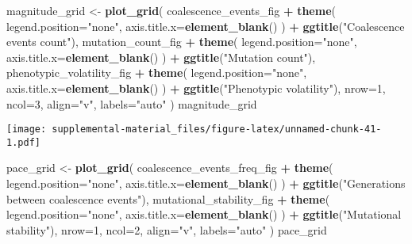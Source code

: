 \documentclass[]{book}
\newenvironment{Shaded}{\begin{snugshade}}{\end{snugshade}}
\newcommand{\DataTypeTok}[1]{\textcolor[rgb]{0.13,0.29,0.53}{#1}}
\newcommand{\DecValTok}[1]{\textcolor[rgb]{0.00,0.00,0.81}{#1}}
\newcommand{\KeywordTok}[1]{\textcolor[rgb]{0.13,0.29,0.53}{\textbf{#1}}}
\newcommand{\NormalTok}[1]{#1}
\newcommand{\OperatorTok}[1]{\textcolor[rgb]{0.81,0.36,0.00}{\textbf{#1}}}
\newcommand{\StringTok}[1]{\textcolor[rgb]{0.31,0.60,0.02}{#1}}
\begin{document}
\begin{Shaded}
\begin{Highlighting}[]
\NormalTok{magnitude_grid <-}\StringTok{ }\KeywordTok{plot_grid}\NormalTok{(}
\NormalTok{  coalescence_events_fig }\OperatorTok{+}
\StringTok{    }\KeywordTok{theme}\NormalTok{(}
      \DataTypeTok{legend.position=}\StringTok{"none"}\NormalTok{,}
      \DataTypeTok{axis.title.x=}\KeywordTok{element_blank}\NormalTok{()}
\NormalTok{    ) }\OperatorTok{+}
\StringTok{    }\KeywordTok{ggtitle}\NormalTok{(}\StringTok{"Coalescence events count"}\NormalTok{),}
\NormalTok{  mutation_count_fig }\OperatorTok{+}
\StringTok{    }\KeywordTok{theme}\NormalTok{(}
      \DataTypeTok{legend.position=}\StringTok{"none"}\NormalTok{,}
      \DataTypeTok{axis.title.x=}\KeywordTok{element_blank}\NormalTok{()}
\NormalTok{    ) }\OperatorTok{+}
\StringTok{    }\KeywordTok{ggtitle}\NormalTok{(}\StringTok{"Mutation count"}\NormalTok{),}
\NormalTok{  phenotypic_volatility_fig }\OperatorTok{+}
\StringTok{    }\KeywordTok{theme}\NormalTok{(}
      \DataTypeTok{legend.position=}\StringTok{"none"}\NormalTok{,}
      \DataTypeTok{axis.title.x=}\KeywordTok{element_blank}\NormalTok{()}
\NormalTok{    ) }\OperatorTok{+}
\StringTok{    }\KeywordTok{ggtitle}\NormalTok{(}\StringTok{"Phenotypic volatility"}\NormalTok{),}
  \DataTypeTok{nrow=}\DecValTok{1}\NormalTok{,}
  \DataTypeTok{ncol=}\DecValTok{3}\NormalTok{,}
  \DataTypeTok{align=}\StringTok{"v"}\NormalTok{,}
  \DataTypeTok{labels=}\StringTok{"auto"}
\NormalTok{)}
\NormalTok{magnitude_grid}
\end{Highlighting}
\end{Shaded}

\texttt{[image: supplemental-material\_files/figure-latex/unnamed-chunk-41-1.pdf]}

\begin{Shaded}
\begin{Highlighting}[]
\NormalTok{pace_grid <-}\StringTok{ }\KeywordTok{plot_grid}\NormalTok{(}
\NormalTok{  coalescence_events_freq_fig }\OperatorTok{+}
\StringTok{    }\KeywordTok{theme}\NormalTok{(}
      \DataTypeTok{legend.position=}\StringTok{"none"}\NormalTok{,}
      \DataTypeTok{axis.title.x=}\KeywordTok{element_blank}\NormalTok{()}
\NormalTok{    ) }\OperatorTok{+}
\StringTok{    }\KeywordTok{ggtitle}\NormalTok{(}\StringTok{"Generations between coalescence events"}\NormalTok{),}
\NormalTok{  mutational_stability_fig }\OperatorTok{+}
\StringTok{    }\KeywordTok{theme}\NormalTok{(}
      \DataTypeTok{legend.position=}\StringTok{"none"}\NormalTok{,}
      \DataTypeTok{axis.title.x=}\KeywordTok{element_blank}\NormalTok{()}
\NormalTok{    ) }\OperatorTok{+}
\StringTok{    }\KeywordTok{ggtitle}\NormalTok{(}\StringTok{"Mutational stability"}\NormalTok{),}
  \DataTypeTok{nrow=}\DecValTok{1}\NormalTok{,}
  \DataTypeTok{ncol=}\DecValTok{2}\NormalTok{,}
  \DataTypeTok{align=}\StringTok{"v"}\NormalTok{,}
  \DataTypeTok{labels=}\StringTok{"auto"}
\NormalTok{)}
\NormalTok{pace_grid}
\end{Highlighting}
\end{Shaded}
\end{document}

